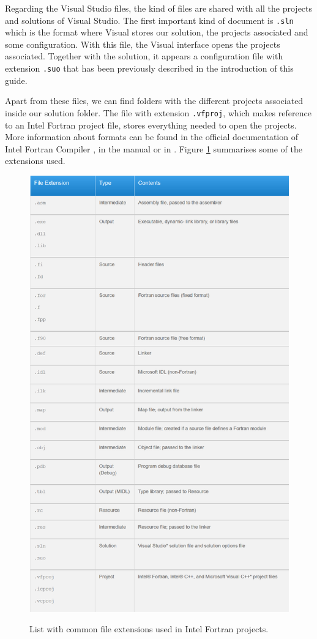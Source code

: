 \begin{enumerate}
	Regarding the Visual Studio files, the kind of files are shared with all the projects and solutions of Visual Studio. The first important kind of document is \texttt{.sln} which is the format where Visual stores our solution, the projects associated and some configuration. With this file, the Visual interface opens the projects associated. Together with the solution, it appears a configuration file with extension \texttt{.suo} that has been previously described in the introduction of this guide.  
    
    Apart from these files, we can find folders with the different projects associated inside our solution folder. The file with extension \texttt{.vfproj}, which makes reference to an Intel Fortran project file, stores everything needed to open the projects. More information about formats can be found in the official documentation of Intel Fortran Compiler \citep{format}, in the manual \citep{manual} or in \citep{format2}. Figure \ref{fig:Formats} summarises some of the extensions used.
    
    \begin{figure}[h]
        \centering
        \caption{List with common file extensions used in Intel Fortran projects.}
        \includegraphics[width= 0.9 \textwidth]{Figures/Formats}
        \label{fig:Formats}
    \end{figure}




\end{enumerate}
